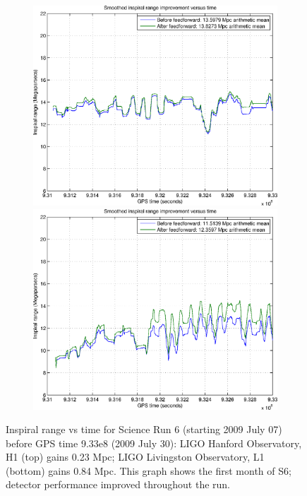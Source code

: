 \begin{figure}
\begin{center}
\includegraphics[height=75mm, width=150mm]{figure14a.eps}
\includegraphics[height=75mm, width=150mm]{figure14b.eps}
\caption{Inspiral range vs time for Science Run 6 (starting 2009 July 07) before GPS time 9.33e8 (2009 July 30):
LIGO Hanford Observatory, H1 (top) gains 0.23 Mpc; LIGO Livingston Observatory, L1 (bottom) gains 0.84 Mpc. This graph shows the first month of S6; detector performance improved throughout the run.}
\label{S6inspiralRange}
\end{center}
\end{figure}
